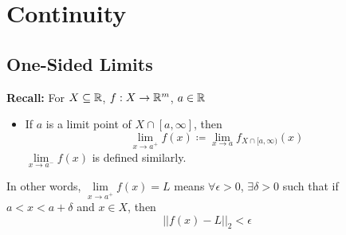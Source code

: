 \documentclass[openany]{report}
\begin{document}
\chapter{Continuity}
\section{One-Sided Limits}
\textbf{Recall:} For $X \subseteq \mathbb{R}$, $f: X \rightarrow \mathbb{R}^m$, $a \in \mathbb{R}$
\begin{itemize}
    \item If $a$ is a limit point of $X \cap [a, \infty]$, then 
    $$\lim_{x \rightarrow a^+} f(x) \coloneqq \lim_{x\rightarrow a}f_{X\cap [a,\infty)}(x)$$
    $\lim\limits_{x\rightarrow a^-}f(x)$ is defined similarly. 
\end{itemize}
In other words, $\lim\limits_{x\rightarrow a^+}f(x) = L$ means $\forall \epsilon>0$, $\exists \delta>0$ such that if $a < x < a + \delta$ and $x \in X$, then 
\[||f(x) - L||_2 < \epsilon\]
\end{document}
